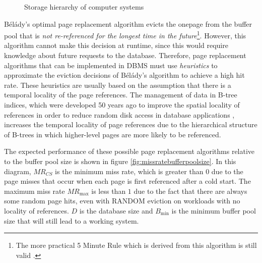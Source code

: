 \begin{@empty}
\begin{figure}
\begin{minipage}{\linewidth}
{
            }
        \end{minipage}
        \vspace{.5em}
        \caption[Storage hierarchy of computer systems]{Storage hierarchy of computer systems}
        \label{fig:storagehierarchy}
        \protect
    \end{figure}
\end{@empty}

    Bélády's optimal page replacement algorithm \cite{Belady:1966} evicts the one\linebreak page from the buffer pool that is \emph{not re-referenced for the longest time in the future}\footnote{The more practical 5 Minute Rule \cite{Gray:1987} which is derived from this algorithm is still valid \cite{Gray:1997}\cite{Graefe:2007}.}. However, this algorithm cannot make this decision at runtime, since this would require knowledge about future requests to the database. Therefore, page replacement algorithms that can be implemented in DBMS must use \emph{heuristics} to approximate the eviction decisions of Bélády's algorithm to achieve a high hit rate. These heuristics are usually based on the assumption that there is a temporal locality of the page references. The management of data in B-tree indices, which were developed 50 years ago to improve the spatial locality of references in order to reduce random disk access in database applications \cite{Bayer:1970}, increases the temporal locality of page references due to the hierarchical structure of B-trees in which higher-level pages are more likely to be referenced.

    The expected performance of these possible page replacement algorithms relative to the buffer pool size is shown in figure \ref{fig:missratebufferpoolsize}. In this diagram, $MR_{CS}$ is the minimum miss rate, which is greater than $0$ due to the page misses that occur when each page is first referenced after a cold start. The maximum miss rate $MR_{\text{max}}$ is less than $1$ due to the fact that there are always some random page hits, even with RANDOM eviction on workloads with no locality of references. $D$ is the database size and $B_{\text{min}}$ is the minimum buffer pool size that will still lead to a working system.

